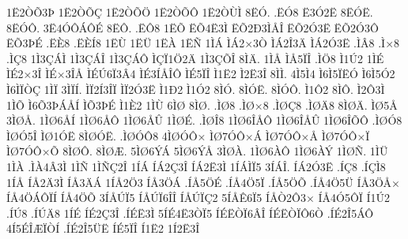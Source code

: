 {1^^cb2^^d2^^d53^^de
1^^cb2^^d2^^d5^^c7
1^^cb2^^d2^^d5^^d6
1^^cb2^^d2^^d5^^d4
1^^cb2^^d2^^d9^^cc
8^^cb^^d3.
.^^cb^^d38
^^cb3^^d32^^cb
8^^cb^^d3^^cb.
8^^cb^^d3^^d4.
3^^cb4^^d3^^d4^^c1^^d4^^c9
8^^cb^^d4.
.^^cb^^d48
1^^cb^^d5
^^cb^^d54^^cb3^^cc
^^cb^^d52^^d03^^cc^^c5^^ce
^^cb^^d52^^d33^^cb
^^cb^^d52^^d33^^d4
^^cb^^d53^^de^^c9
.^^cb^^c88
.^^cb^^c8^^cd8
1^^cb^^d9
1^^cb^^dc
1^^cb^^c0
1^^cb^^d1
1^^cc^^c1
^^cc^^c12^^d73^^d2
^^cc^^c12^^ce3^^c4
^^cc^^c12^^d33^^cb
.^^cc^^c28
.^^cc^^d78
.^^cc^^c78
1^^cc3^^c7^^c1^^cc
1^^cc3^^c7^^c1^^ce
1^^cc3^^c7^^c1^^d4
^^cc^^c7^^cf1^^d62^^c4
1^^cc3^^c7^^d5^^ce
8^^cc^^c4.
1^^cc^^c5
^^cc^^c55^^cf^^ce
.^^cc^^d68
^^cc1^^da2
1^^cc^^c9
^^cc^^c92^^d73^^ce
^^cc^^c9^^d73^^ce^^c5
^^cc^^c9^^da6^^cf3^^c24
^^cc^^c93^^cd^^c5^^ce^^d4
^^cc^^c95^^cf^^ce
^^cc1^^cb2
^^cc2^^cb3^^ce
8^^cc^^cc.
4^^cc5^^cc4
^^cc6^^cc5^^cf^^cb^^d3
^^cc6^^cc5^^d32
^^cc6^^cc^^cf^^d2^^c7
1^^cc^^cf
3^^cc^^cf^^cd.
^^cc^^cf2^^cd3^^ce^^cf
^^cc^^cf2^^d33^^cb
^^cc1^^d02
^^cc1^^d32
8^^cc^^d3.
8^^cc^^d3^^cb.
8^^cc^^d3^^d4.
^^cc1^^d42
8^^cc^^d4.
^^cc2^^d43^^cc
1^^cc^^d5
^^cc6^^d53^^de^^c1^^c5^^cd
^^cc^^d53^^de^^c9
^^cc1^^c82
1^^cc^^d9
6^^cc^^d8
8^^cc^^d8.
.^^cc^^d88
.^^cc^^d8^^d78
.^^cc^^d8^^c78
.^^cc^^d8^^c48
8^^cc^^d8^^c4.
^^cc^^d85^^c5
3^^cc^^d8^^c5.
1^^cc^^d86^^c5^^cd
1^^cc^^d86^^c5^^d4
1^^cc^^d86^^c5^^db
1^^cc^^d8^^c9.
.^^cc^^d8^^ce8
1^^cc^^d86^^ce^^c5^^d4
1^^cc^^d86^^ce^^c5^^db
1^^cc^^d86^^ce^^d5^^d4
.^^cc^^d8^^d38
^^cc^^d8^^d35^^ce
^^cc^^d81^^d3^^cb
8^^cc^^d8^^d3^^cb.
.^^cc^^d8^^d3^^d48
4^^cc^^d8^^d3^^d4^^d7
^^cc^^d87^^d3^^d4^^d7^^c1
^^cc^^d87^^d3^^d4^^d7^^c5
^^cc^^d87^^d3^^d4^^d7^^cf
^^cc^^d87^^d3^^d4^^d7^^d5
8^^cc^^d8^^d4.
8^^cc^^d8^^c6.
5^^cc^^d86^^dd^^c1
5^^cc^^d86^^dd^^c5
3^^cc^^d8^^c0.
1^^cc^^d86^^c0^^d4
1^^cc^^d86^^c0^^dd
1^^cc^^d8^^d1.
1^^cc^^dc
1^^cc^^c0
.^^cc^^c04^^c23^^cc
1^^cc^^d1
1^^cc^^d1^^c72^^ce
1^^cd^^c1
^^cd^^c12^^c73^^ce
^^cd^^c12^^cb3^^cc
1^^cd^^c1^^cc^^cf5
3^^cd^^c1^^ce.
^^cd^^c12^^d33^^cb
.^^cd^^c78
.^^cd^^c7^^cc8
1^^cd^^c5
^^cd^^c52^^c43^^cc
^^cd^^c53^^c4^^c1
1^^cd^^c52^^d63
^^cd^^c53^^d6^^c1
.^^cd^^c55^^d6^^c9
.^^cd^^c54^^d65^^cf
.^^cd^^c55^^d6^^d5
.^^cd^^c54^^d65^^dc
^^cd^^c53^^d6^^c5^^d7
^^cd^^c54^^d6^^c1^^d4^^cf^^cd
^^cd^^c54^^d6^^d5
3^^cd^^c5^^da^^cf5
^^cd^^c5^^da^^cf6^^ce^^ce
^^cd^^c5^^da^^cf^^c72
5^^cd^^c5^^ca6^^cf5
^^cd^^c5^^d22^^d43^^d7
^^cd^^c54^^d35^^d4^^cf
^^cd1^^da2
.^^cd^^da8
.^^cd^^da^^c48
1^^cd^^c9
^^cd^^c92^^c73^^ce
.^^cd^^c9^^cb3^^cc
5^^cd^^c94^^cb3^^d2^^cf5
^^cd^^c9^^cb^^d2^^cf6^^c2^^ce
^^cd^^c9^^cb^^d2^^cf^^d46^^d2
.^^cd^^c92^^ce5^^c1^^d4
4^^cd5^^c9^^ce^^c6^^cf^^d2^^cd
.^^cd^^c92^^ce5^^dc^^cb
^^cd^^c95^^cf^^ce
^^cd1^^cb2
1^^cd2^^cb3^^ce
}
